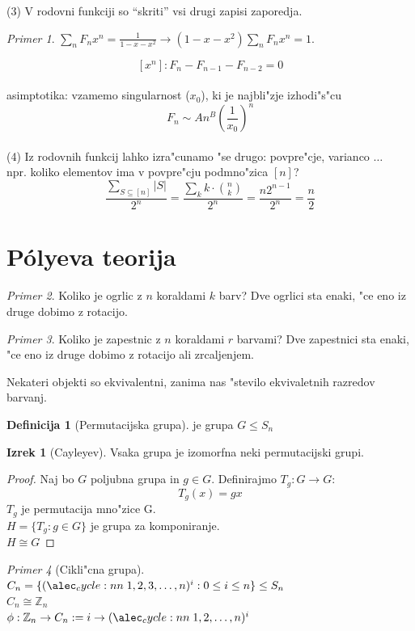 \documentclass[a4paper,12pt]{article}
\theoremstyle{definition}
\newtheorem{defn}[counter]{Definicija}
\newtheorem{theorem}[counter]{Izrek}
\theoremstyle{remark}
\newtheorem*{ex}{Primer}
\newcommand{\Z}{\mathbb{Z}}
\begin{document}
(3) V rodovni funkciji so ``skriti'' vsi drugi zapisi zaporedja.
\begin{ex}
	$\sum_n F_n x^n = \frac{1}{1-x-x^2} \to (1-x-x^2) \sum_n F_n x^n = 1$.
\end{ex}
\[[x^n]: F_n - F_{n-1} - F_{n-2} = 0 \] \\
asimptotika: vzamemo singularnost ($x_0$), ki je najbli"zje izhodi"s"cu \[F_n \sim An^B(\frac{1}{x_0})^n\] \\
(4) Iz rodovnih funkcij lahko izra"cunamo "se drugo: povpre"cje, varianco $\dots$ \\
npr. koliko elementov ima v povpre"cju podmno"zica $[n]$?
\[\frac{\sum_{S \subseteq [n]} |S|}{2^n} = \frac{\sum_k k \cdot \binom{n}{k}}{2^n} = \frac{n2^{n-1}}{2^n} = \frac{n}{2}\]

\section{P\'{o}lyeva teorija}
\begin{ex}
	Koliko je ogrlic z $n$ koraldami $k$ barv?
	Dve ogrlici sta enaki, "ce eno iz druge dobimo z rotacijo.
\end{ex}
\begin{ex}
	Koliko je zapestnic z $n$ koraldami $r$ barvami?
	Dve zapestnici sta enaki, "ce eno iz druge dobimo z rotacijo ali zrcaljenjem.
\end{ex}
Nekateri objekti so ekvivalentni, zanima nas "stevilo ekvivaletnih razredov barvanj.

\begin{defn}[Permutacijska grupa]
	je grupa $G \leq S_n$
\end{defn}
\begin{theorem}[Cayleyev]
	Vsaka grupa je izomorfna neki permutacijski grupi.
\end{theorem}
\begin{proof}
	Naj bo $G$ poljubna grupa in $g \in G$. Definirajmo $T_g: G \rightarrow G$:
	\[ T_g(x) = gx \]
	$T_g$ je permutacija mno"zice G. \\
	$H = \lbrace T_g: g \in G \rbrace$ je grupa za komponiranje. \\
	$H \cong G$
\end{proof}
\begin{ex}[Cikli"cna grupa]
	$C_n = \lbrace \cycle{1, 2, 3, \ldots, n}^i: 0 \leq i \le n \rbrace \leq S_n$\\
	$C_n \cong \Z_n$\\
	$\phi: \Z_n \rightarrow C_n := i \rightarrow \cycle{1, 2, \ldots, n}^i$
\end{ex}
\end{document}
